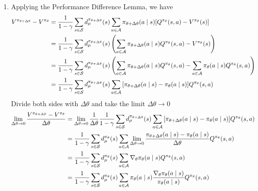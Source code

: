 \begin{Solution}
\begin{enumerate} [label=\alph*)]
        \item
        Applying the Performance Difference Lemma, we have
        $$
        \begin{aligned}
        V^{\pi_{\theta+\Delta\theta}}-V^{\pi_\theta} & = \dfrac{1}{1 - \gamma} \sum_{s \in \mathcal{S}}  d_\mu^{\pi_{\theta + \Delta \theta}}(s) \sum_{a \in \mathcal{A}} \pi_{\theta + \Delta \theta}(a \mid s) \automedpar{Q^{\pi_\theta}(s,a) - V^{\pi_\theta}(s)} \\
        & = \dfrac{1}{1 - \gamma} \sum_{s \in \mathcal{S}}  d_\mu^{\pi_{\theta + \Delta \theta}}(s) \left ( \sum_{a \in \mathcal{A}} \pi_{\theta + \Delta \theta}(a \mid s) Q^{\pi_\theta}(s,a) - V^{\pi_\theta}(s) \right ) \\
        & = \dfrac{1}{1 - \gamma} \sum_{s \in \mathcal{S}}  d_\mu^{\pi_{\theta + \Delta \theta}}(s) \left ( \sum_{a \in \mathcal{A}} \pi_{\theta + \Delta \theta}(a \mid s) Q^{\pi_\theta}(s,a) - \sum_{a \in \mathcal{A}} \pi_{\theta}(a \mid s) Q^{\pi_\theta}(s,a) \right ) \\
        & = \dfrac{1}{1 - \gamma} \sum_{s \in \mathcal{S}}  d_\mu^{\pi_{\theta + \Delta \theta}}(s) \sum_{a \in \mathcal{A}} \automedpar{\pi_{\theta + \Delta \theta}(a \mid s) - \pi_{\theta}(a \mid s)} Q^{\pi_\theta}(s,a)  \\
        \end{aligned}
        $$
        Divide both sides with $\Delta \theta$ and take the limit $\Delta \theta \rightarrow 0$
        $$
        \begin{aligned}
        \lim_{\Delta \theta \rightarrow 0} \dfrac{V^{\pi_{\theta+\Delta\theta}}-V^{\pi_\theta}}{\Delta \theta} & = \lim_{\Delta \theta \rightarrow 0}\dfrac{1}{\Delta \theta}\dfrac{1}{1 - \gamma} \sum_{s \in \mathcal{S}}  d_\mu^{\pi_{\theta + \Delta \theta}}(s) \sum_{a \in \mathcal{A}} \automedpar{\pi_{\theta + \Delta \theta}(a \mid s) - \pi_{\theta}(a \mid s)} Q^{\pi_\theta}(s,a) \\
        & = \dfrac{1}{1 - \gamma} \sum_{s \in \mathcal{S}}  d_\mu^{\pi_{\theta}}(s) \sum_{a \in \mathcal{A}} \lim_{\Delta \theta \rightarrow 0} \dfrac{\pi_{\theta + \Delta \theta}(a \mid s) - \pi_{\theta}(a \mid s)}{\Delta \theta} Q^{\pi_\theta}(s,a)  \\
        & = \dfrac{1}{1 - \gamma} \sum_{s \in \mathcal{S}}  d_\mu^{\pi_{\theta}}(s) \sum_{a \in \mathcal{A}} \nabla_\theta \pi_{\theta}(a \mid s) Q^{\pi_\theta}(s,a)  \\
        & = \dfrac{1}{1 - \gamma} \sum_{s \in \mathcal{S}}  d_\mu^{\pi_{\theta}}(s) \sum_{a \in \mathcal{A}} \pi_{\theta}(a \mid s) \dfrac{\nabla_\theta \pi_{\theta}(a \mid s)}{\pi_{\theta}(a \mid s)} Q^{\pi_\theta}(s,a)  \\

\end{aligned}$$
\end{enumerate}
\end{Solution}
